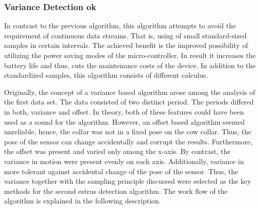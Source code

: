 \documentclass[english,12pt,a4paper,pdftex,elec,utf8]{aaltothesis}
\begin{document}
\subsubsection{Variance Detection ok} \label{variancedetectionsection}

In contrast to the previous algorithm, this algorithm attempts to avoid the requirement of continuous data streams. That is, using of small standard-sized samples in certain intervals. The achieved benefit is the improved possibility of utilizing the power saving modes of the micro-controller. In result it increases the battery life and thus, cuts the maintenance costs of the device. In addition to the standardized samples, this algorithm consists of different calculus. 

Originally, the concept of a variance based algorithm arose among the analysis of the first data set. The data consisted of two distinct period. The periods differed in both, variance and offset. In theory, both of these features could have been used as a sound for the algorithm. However, an offset based algorithm seemed unreliable, hence, the collar was not in a fixed pose on the cow collar. Thus, the pose of the sensor can change accidentally and corrupt the results. Furthermore, the offset was present and varied only among the x-axis. By contrast, the variance in motion were present evenly on each axis. Additionally, variance in more tolerant against accidental change of the pose of the sensor. Thus, the variance together with the sampling principle discussed were selected as the key methods for the second estrus detection algorithm. The work flow of the algorithm is explained in the following description.
\end{document}
